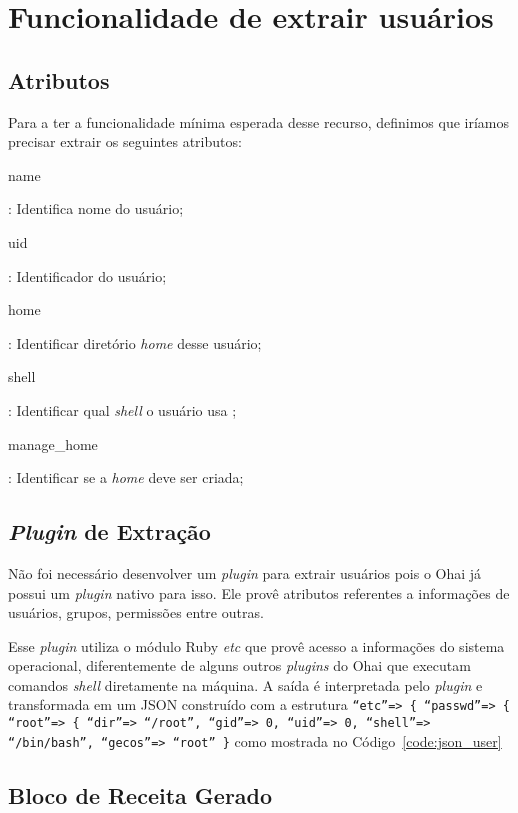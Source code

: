 \section{Funcionalidade de extrair usuários}
\label{sec:users}

\subsection{Atributos}

Para a ter a funcionalidade mínima esperada desse recurso, definimos que iríamos precisar
extrair os seguintes atributos:


\begin{itemize}
    {\itshape\item name}: Identifica nome do usuário;
    {\itshape\item uid}: Identificador do usuário;
    {\itshape\item home}: Identificar diretório \textit{home} desse usuário;
    {\itshape\item shell}: Identificar qual \textit{shell} o usuário usa ;
    {\itshape\item manage\_home}: Identificar se a \textit{home} deve ser criada;
\end{itemize}

\subsection{\textit{Plugin} de Extração}
Não foi necessário desenvolver um \textit{plugin} para extrair usuários pois o Ohai
já possui um \textit{plugin} nativo para isso. Ele provê atributos referentes
a informações de usuários, grupos, permissões entre outras.

Esse \textit{plugin} utiliza o módulo Ruby \textit{etc} que provê acesso a informações
do sistema operacional, diferentemente de alguns outros \textit{plugins} do Ohai
que executam comandos \textit{shell} diretamente na máquina. A saída é interpretada
pelo \textit{plugin} e transformada em um JSON construído com a estrutura
\texttt{``etc''=> \{ ``passwd''=> \{ ``root''=> \{ ``dir''=> ``/root'', ``gid''=> 0, ``uid''=> 0, ``shell''=> ``/bin/bash'', ``gecos''=> ``root'' \}} 
como mostrada no Código~\ref{code:json_user}

\noindent\begin{minipage}{\textwidth}
  \lstset{style=shell}
  
\end{minipage}\hfill

\subsection{Bloco de Receita Gerado}

